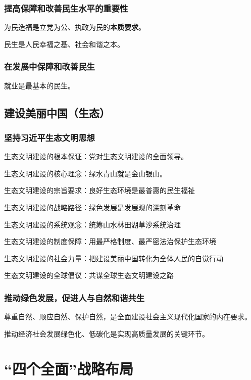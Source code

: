 \documentclass[12pt, a4paper, oneside]{ctexart}
\begin{document}
\subsubsection{提高保障和改善民生水平的重要性}

为民造福是立党为公、执政为民的\textbf{本质要求}。

民生是人民幸福之基、社会和谐之本。

\subsubsection{在发展中保障和改善民生}

就业是最基本的民生。

\subsection{建设美丽中国（生态）}

\subsubsection{坚持习近平生态文明思想}

生态文明建设的根本保证：党对生态文明建设的全面领导。

生态文明建设的核心理念：绿水青山就是金山银山。

生态文明建设的宗旨要求：良好生态环境是最普惠的民生福祉

生态文明建设的战略路径：绿色发展是发展观的深刻革命

生态文明建设的系统观念：统筹山水林田湖草沙系统治理

生态文明建设的制度保障：用最严格制度、最严密法治保护生态环境

生态文明建设的社会力量：把建设美丽中国转化为全体人民的自觉行动

生态文明建设的全球倡议：共谋全球生态文明建设之路

\subsubsection{推动绿色发展，促进人与自然和谐共生}

尊重自然、顺应自然、保护自然，是全面建设社会主义现代化国家的内在要求。

推动经济社会发展绿色化、低碳化是实现高质量发展的关键环节。

\section{“四个全面”战略布局}
\end{document}
